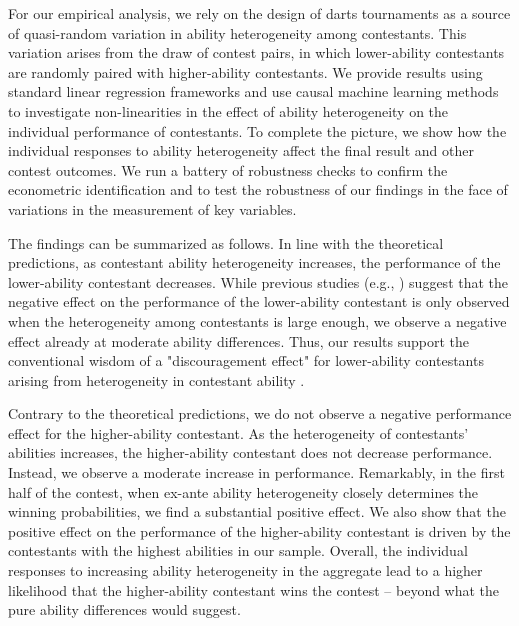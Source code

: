 \documentclass[11pt,a4paper]{article}
\begin{document}
For our empirical analysis, we rely on the design of darts tournaments as a source of quasi-random variation in ability heterogeneity among contestants. This variation arises from the draw of contest pairs, in which lower-ability contestants are randomly paired with higher-ability contestants. We provide results using standard linear regression frameworks and use causal machine learning methods to investigate non-linearities in the effect of ability heterogeneity on the individual performance of contestants.
To complete the picture, we show how the individual responses to ability heterogeneity affect the final result and other contest outcomes. We run a battery of robustness checks to confirm the econometric identification and to test the robustness of our findings in the face of variations in the measurement of key variables.\par

The findings can be summarized as follows. In line with the theoretical predictions, as contestant ability heterogeneity increases, the performance of the lower-ability contestant decreases. While previous studies (e.g., ) suggest that the negative effect on the performance of the lower-ability contestant is only observed when the heterogeneity among contestants is large enough, we observe a negative effect already at moderate ability differences. Thus, our results support the conventional wisdom of a "discouragement effect" for lower-ability contestants arising from heterogeneity in contestant ability \cite{Drugov.2022}.\par  

Contrary to the theoretical predictions, we do not observe a negative performance effect for the higher-ability contestant. As the heterogeneity of contestants' abilities increases, the higher-ability contestant does not decrease performance. Instead, we observe a moderate increase in performance. Remarkably, in the first half of the contest, when ex-ante ability heterogeneity closely determines the winning probabilities, we find a substantial positive effect. 
We also show that the positive effect on the performance of the higher-ability contestant is driven by the contestants with the highest abilities in our sample. Overall, the individual responses to increasing ability heterogeneity in the aggregate lead to a higher likelihood that the higher-ability contestant wins the contest -- beyond what the pure ability differences would suggest.\par
\end{document}
